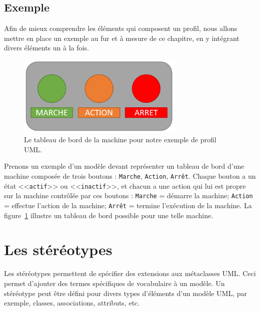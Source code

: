 
\subsection*{Exemple}
%
Afin de mieux comprendre les éléments qui composent un profil, nous allons mettre en place un exemple au fur et à mesure de ce chapitre, en y intégrant divers éléments un \`a la fois.

\begin{figure}
    \centering
    \includegraphics[width=8cm]{10_img/chap4/example.PNG}
    \caption{Le tableau de bord de la machine pour notre exemple de profil UML.}
    \label{fig.uml_ex}
\end{figure}

Prenons un exemple d'un mod\`ele devant représenter un tableau de bord d'une machine composée de trois boutons : \texttt{Marche}, \texttt{Action}, \texttt{Arrêt}.
Chaque bouton a un état <<\texttt{actif}>> ou <<\texttt{inactif}>>, et
chacun a une action qui lui est propre sur la machine contr\^ol\'ee par ces boutons : \texttt{Marche} = démarre la machine; \texttt{Action} = effectue l'action de la machine; \texttt{Arrêt} = termine l'ex\'ecution de la machine.
%
La figure~\ref{fig.uml_ex} illustre un tableau de bord possible pour une telle machine.


\section{Les stéréotypes}
\label{sect.uml.ster}
Les stéréotypes permettent de spécifier des extensions aux métaclasses UML.
Ceci permet d'ajouter des termes spécifiques de vocabulaire à un mod\`ele.
Un stéréotype peut être défini pour divers types d'éléments d'un mod\`ele UML, par exemple, classes, associations, attributs, etc.


